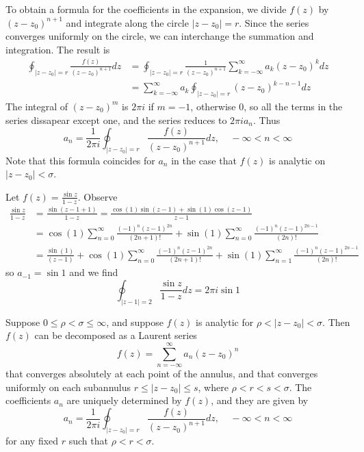\documentclass[12pt, a4paper, oneside, openright, titlepage]{book}
\begin{document}
To obtain a formula for the coefficients in the expansion, we divide $f(z)$ by $(z-z_0)^{n+1}$ and integrate along the circle $|z-z_0| = r$. Since the series converges uniformly on the circle, we can interchange the summation and integration. The result is \begin{align*}
    \oint_{|z-z_0|=r}\frac{f(z)}{(z-z_0)^{n+1}}dz &= \oint_{|z-z_0|=r}\frac{1}{(z-z_0)^{n+1}}\sum_{k=-\infty}^{\infty}a_k(z-z_0)^kdz \\
    &= \sum_{k=-\infty}^{\infty}a_k\oint_{|z-z_0|=r}(z-z_0)^{k-n-1}dz
\end{align*}
The integral of $(z-z_0)^m$ is $2\pi i$ if $m = -1$, otherwise $0$, so all the terms in the series dissapear except one, and the series reduces to $2\pi ia_n$. Thus \begin{equation*}
    a_n = \frac{1}{2\pi i}\oint_{|z-z_0|=r}\frac{f(z)}{(z-z_0)^{n+1}}dz,\;\;\;\;-\infty < n < \infty
\end{equation*}
Note that this formula coincides for $a_n$ in the case that $f(z)$ is analytic on $|z-z_0| < \sigma$.

\begin{eg}
    Let $f(z) = \frac{\sin z}{1-z}$. Observe \begin{align*}
        \frac{\sin z}{1-z} &= \frac{\sin(z-1+1)}{1-z} = \frac{\cos(1)\sin(z-1)+\sin(1)\cos(z-1)}{z-1} \\
        &= \cos(1)\sum_{n=0}^{\infty}\frac{(-1)^n(z-1)^{2n}}{(2n+1)!}+\sin(1)\sum_{n=0}^{\infty}\frac{(-1)^n(z-1)^{2n-1}}{(2n)!} \\
        &= \frac{\sin(1)}{(z-1)} + \cos(1)\sum_{n=0}^{\infty}\frac{(-1)^n(z-1)^{2n}}{(2n+1)!}+\sin(1)\sum_{n=1}^{\infty}\frac{(-1)^n(z-1)^{2n-1}}{(2n)!}
    \end{align*}
    so $a_{-1} = \sin 1$ and we find \begin{equation*}
        \oint_{|z-1|=2}\frac{\sin z}{1-z}dz = 2\pi i\sin1
    \end{equation*}
\end{eg}

\begin{namthm}
    Suppose $0 \leq \rho < \sigma \leq \infty$, and suppose $f(z)$ is analytic for $\rho < |z-z_0| < \sigma$. Then $f(z)$ can be decomposed as a Laurent series \begin{equation*}
        f(z) = \sum_{n=-\infty}^{\infty}a_n(z-z_0)^n
    \end{equation*}
    that converges absolutely at each point of the annulus, and that converges uniformly on each subannulus $r \leq |z-z_0| \leq s$, where $\rho < r < s < \sigma$. The coefficients $a_n$ are uniquely determined by $f(z)$, and they are given by \begin{equation*}
        a_n = \frac{1}{2\pi i}\oint_{|z-z_0|=r}\frac{f(z)}{(z-z_0)^{n+1}}dz,\;\;\;\;-\infty < n < \infty
    \end{equation*}
    for any fixed $r$ such that $\rho < r < \sigma$.
\end{namthm}
\end{document}
